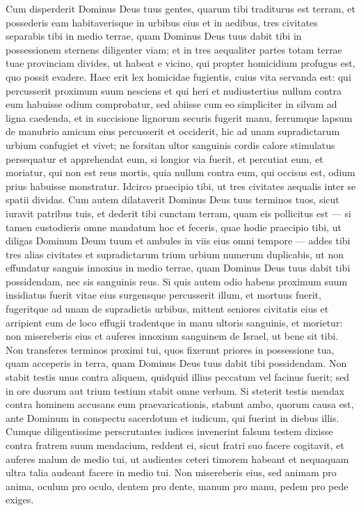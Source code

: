 \begin{biblechapter} 
\verse Cum disperderit Dominus Deus tuus gentes, quarum tibi traditurus est terram, et possederis eam habitaverisque in urbibus eius et in aedibus, 
\verse tres civitates separabis tibi in medio terrae, quam Dominus Deus tuus dabit tibi in possessionem 
\verse sternens diligenter viam; et in tres aequaliter partes totam terrae tuae provinciam divides, ut habeat e vicino, qui propter homicidium profugus est, quo possit evadere. 
\verse Haec erit lex homicidae fugientis, cuius vita servanda est: qui percusserit proximum suum nesciens et qui heri et nudiustertius nullum contra eum habuisse odium comprobatur, 
\verse sed abiisse cum eo simpliciter in silvam ad ligna caedenda, et in succisione lignorum securis fugerit manu, ferrumque lapsum de manubrio amicum eius percusserit et occiderit, hic ad unam supradictarum urbium confugiet et vivet; 
\verse ne forsitan ultor sanguinis cordis calore stimulatus persequatur et apprehendat eum, si longior via fuerit, et percutiat eum, et moriatur, qui non est reus mortis, quia nullum contra eum, qui occisus est, odium prius habuisse monstratur. 
\verse Idcirco praecipio tibi, ut tres civitates aequalis inter se spatii dividas. 
\verse Cum autem dilataverit Dominus Deus tuus terminos tuos, sicut iuravit patribus tuis, et dederit tibi cunctam terram, quam eis pollicitus est 
\verse — si tamen custodieris omne mandatum hoc et feceris, quae hodie praecipio tibi, ut diligas Dominum Deum tuum et ambules in viis eius omni tempore — addes tibi tres alias civitates et supradictarum trium urbium numerum duplicabis, 
\verse ut non effundatur sanguis innoxius in medio terrae, quam Dominus Deus tuus dabit tibi possidendam, nec sis sanguinis reus. 
\verse Si quis autem odio habens proximum suum insidiatus fuerit vitae eius surgensque percusserit illum, et mortuus fuerit, fugeritque ad unam de supradictis urbibus, 
\verse mittent seniores civitatis eius et arripient eum de loco effugii tradentque in manu ultoris sanguinis, et morietur: 
\verse non misereberis eius et auferes innoxium sanguinem de Israel, ut bene sit tibi. 
\verse Non transferes terminos proximi tui, quos fixerunt priores in possessione tua, quam acceperis in terra, quam Dominus Deus tuus dabit tibi possidendam. 
\verse Non stabit testis unus contra aliquem, quidquid illius peccatum vel facinus fuerit; sed in ore duorum aut trium testium stabit omne verbum. 
\verse Si steterit testis mendax contra hominem accusans eum praevaricationis, 
\verse stabunt ambo, quorum causa est, ante Dominum in conspectu sacerdotum et iudicum, qui fuerint in diebus illis. 
\verse Cumque diligentissime perscrutantes iudices invenerint falsum testem dixisse contra fratrem suum mendacium, 
\verse reddent ei, sicut fratri suo facere cogitavit, et auferes malum de medio tui, 
\verse ut audientes ceteri timorem habeant et nequaquam ultra talia audeant facere in medio tui. 
\verse Non misereberis eius, sed animam pro anima, oculum pro oculo, dentem pro dente, manum pro manu, pedem pro pede exiges. 
\end{biblechapter}


